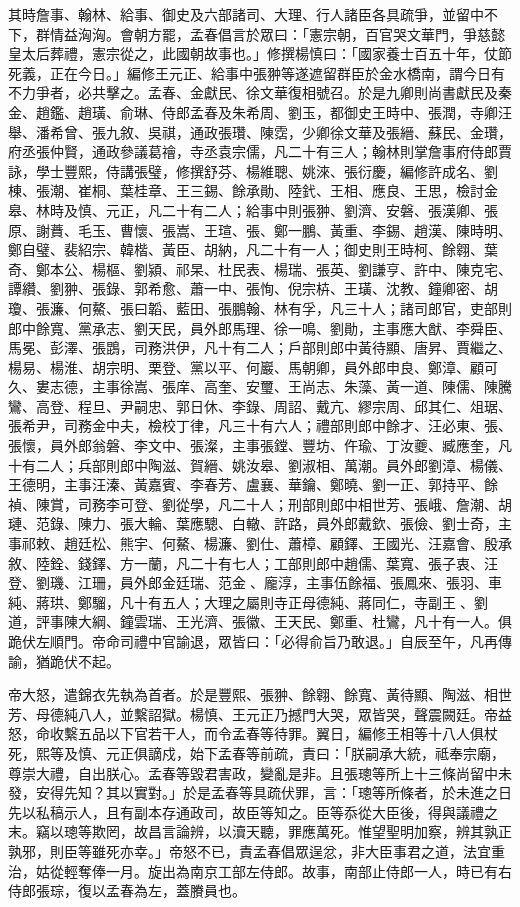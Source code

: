 \begin{pinyinscope}
其時詹事、翰林、給事、御史及六部諸司、大理、行人諸臣各具疏爭，並留中不下，群情益洶洶。會朝方罷，孟春倡言於眾曰：「憲宗朝，百官哭文華門，爭慈懿皇太后葬禮，憲宗從之，此國朝故事也。」修撰楊慎曰：「國家養士百五十年，仗節死義，正在今日。」編修王元正、給事中張翀等遂遮留群臣於金水橋南，謂今日有不力爭者，必共擊之。孟春、金獻民、徐文華復相號召。於是九卿則尚書獻民及秦金、趙鑑、趙璜、俞琳、侍郎孟春及朱希周、劉玉，都御史王時中、張潤，寺卿汪舉、潘希曾、張九敘、吳祺，通政張瓚、陳霑，少卿徐文華及張縉、蘇民、金瓚，府丞張仲賢，通政參議葛禬，寺丞袁宗儒，凡二十有三人；翰林則掌詹事府侍郎賈詠，學士豐熙，侍講張璧，修撰舒芬、楊維聰、姚淶、張衍慶，編修許成名、劉棟、張潮、崔桐、葉桂章、王三錫、餘承勛、陸釴、王相、應良、王思，檢討金皋、林時及慎、元正，凡二十有二人；給事中則張翀、劉濟、安磐、張漢卿、張原、謝蕡、毛玉、曹懷、張嵩、王瑄、張、鄭一鵬、黃重、李錫、趙漢、陳時明、鄭自璧、裴紹宗、韓楷、黃臣、胡納，凡二十有一人；御史則王時柯、餘翱、葉奇、鄭本公、楊樞、劉潁、祁杲、杜民表、楊瑞、張英、劉謙亨、許中、陳克宅、譚纘、劉翀、張錄、郭希愈、蕭一中、張恂、倪宗枿、王璜、沈教、鐘卿密、胡瓊、張濂、何鰲、張曰韜、藍田、張鵬翰、林有孚，凡三十人；諸司郎官，吏部則郎中餘寬、黨承志、劉天民，員外郎馬理、徐一鳴、劉勛，主事應大猷、李舜臣、馬冕、彭澤、張鵾，司務洪伊，凡十有二人；戶部則郎中黃待顯、唐昇、賈繼之、楊易、楊淮、胡宗明、栗登、黨以平、何巖、馬朝卿，員外郎申良、鄭漳、顧可久、婁志德，主事徐嵩、張庠、高奎、安璽、王尚志、朱藻、黃一道、陳儒、陳騰鸞、高登、程旦、尹嗣忠、郭日休、李錄、周詔、戴亢、繆宗周、邱其仁、俎琚、張希尹，司務金中夫，檢校丁律，凡三十有六人；禮部則郎中餘才、汪必東、張、張懷，員外郎翁磐、李文中、張澯，主事張鏜、豐坊、仵瑜、丁汝夔、臧應奎，凡十有二人；兵部則郎中陶滋、賀縉、姚汝皋、劉淑相、萬潮。員外郎劉漳、楊儀、王德明，主事汪溱、黃嘉賓、李春芳、盧襄、華鑰、鄭曉、劉一正、郭持平、餘禎、陳賞，司務李可登、劉從學，凡二十人；刑部則郎中相世芳、張峨、詹潮、胡璉、范錄、陳力、張大輪、葉應驄、白轍、許路，員外郎戴欽、張儉、劉士奇，主事祁敕、趙廷松、熊宇、何鰲、楊濂、劉仕、蕭樟、顧鐸、王國光、汪嘉會、殷承敘、陸銓、錢鐸、方一蘭，凡二十有七人；工部則郎中趙儒、葉寬、張子衷、汪登、劉璣、江珊，員外郎金廷瑞、范金、龐淳，主事伍餘福、張鳳來、張羽、車純、蔣珙、鄭騮，凡十有五人；大理之屬則寺正母德純、蔣同仁，寺副王、劉道，評事陳大綱、鐘雲瑞、王光濟、張徽、王天民、鄭重、杜鸞，凡十有一人。俱跪伏左順門。帝命司禮中官諭退，眾皆曰：「必得俞旨乃敢退。」自辰至午，凡再傳諭，猶跪伏不起。

帝大怒，遣錦衣先執為首者。於是豐熙、張翀、餘翱、餘寬、黃待顯、陶滋、相世芳、母德純八人，並繫詔獄。楊慎、王元正乃撼門大哭，眾皆哭，聲震闕廷。帝益怒，命收繫五品以下官若干人，而令孟春等待罪。翼日，編修王相等十八人俱杖死，熙等及慎、元正俱謫戍，始下孟春等前疏，責曰：「朕嗣承大統，祗奉宗廟，尊崇大禮，自出朕心。孟春等毀君害政，變亂是非。且張璁等所上十三條尚留中未發，安得先知？其以實對。」於是孟春等具疏伏罪，言：「璁等所條者，於未進之日先以私稿示人，且有副本存通政司，故臣等知之。臣等忝從大臣後，得與議禮之末。竊以璁等欺罔，故昌言論辨，以瀆天聽，罪應萬死。惟望聖明加察，辨其孰正孰邪，則臣等雖死亦幸。」帝怒不已，責孟春倡眾逞忿，非大臣事君之道，法宜重治，姑從輕奪俸一月。旋出為南京工部左侍郎。故事，南部止侍郎一人，時已有右侍郎張琮，復以孟春為左，蓋賸員也。


\end{pinyinscope}
